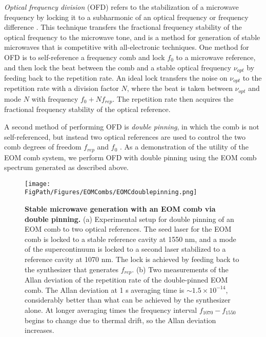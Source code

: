 \textit{Optical frequency division} (OFD) refers to the stabilization of a microwave frequency by locking it to a subharmonic of an optical frequency or frequency difference \cite{McFerran2005,Fortier2011}. This technique transfers the fractional frequency stability of the optical frequency to the microwave tone, and is a method for generation of stable microwaves that is competitive with all-electronic techniques. One method for OFD is to self-reference a frequency comb and lock $f_0$ to a microwave reference, and then lock the beat between the comb and a stable optical frequency $\nu_{opt}$ by feeding back to the repetition rate. An ideal lock transfers the noise on $\nu_{opt}$ to the repetition rate with a division factor $N$, where the beat is taken between $\nu_{opt}$ and mode $N$ with frequency $f_0+Nf_{rep}$. The repetition rate then acquires the fractional frequency stability of the optical reference.

A second method of performing OFD is \textit{double pinning}, in which the comb is not self-referenced, but instead two optical references are used to control the two comb degrees of freedom $f_{rep}$ and $f_0$ \cite{Swann2011,Papp2014,Li2014b}. As a demonstration of the utility of the EOM comb system, we perform OFD with double pinning using the EOM comb spectrum generated as described above.

\begin{figure}[htpb]
	\begin{center}
		\texttt{[image: \\FigPath/Figures/EOMCombs/EOMCdoublepinning.png]}
	\end{center}
	\caption[Stable microwave generation with an EOM comb via double pinning]{\textbf{Stable microwave generation with an EOM comb via double pinning.} (a) Experimental setup for double pinning of an EOM comb to two optical references. The seed laser for the EOM comb is locked to a stable reference cavity at 1550 nm, and a mode of the supercontinuum is locked to a second laser stabilized to a reference cavity at 1070 nm. The lock is achieved by feeding back to the synthesizer that generates $f_{rep}$. (b) Two measurements of the Allan deviation of the repetition rate of the double-pinned EOM comb. The Allan deviation at 1 s averaging time is $\sim1.5\times10^{-14}$, considerably better than what can be achieved by the synthesizer alone. At longer averaging times the frequency interval $f_{1070}-f_{1550}$ begins to change due to thermal drift, so the Allan deviation increases.}
	\label{fig:EOMCdoublepinning}
\end{figure} 

